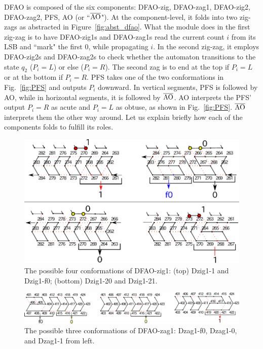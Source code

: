 

DFAO is composed of the six components: DFAO-zig, DFAO-zag1, DFAO-zig2, DFAO-zag2, PFS, AO (or  ``$\overline{\rm AO}$").
At the component-level, it folds into two zig-zags as abstracted in Figure~\ref{fig:abst_dfao}.
What the module does in the first zig-zag is to have DFAO-zig1s and DFAO-zag1s read the current count $i$ from its LSB and ``mark" the first 0, while propagating $i$.
In the second zig-zag, it employs DFAO-zig2s and DFAO-zag2s to check whether the automaton transitions to the state $q_2$ ($P_i = L$) or else ($P_i = R$).
The second zag is to end at the top if $P_i = L$ or at the bottom if $P_i = R$.
PFS takes one of the two conformations in Fig.~\ref{fig:PFS} and outputs $P_i$ downward.
In vertical segments, PFS is followed by AO, while in horizontal segments, it is followed by $\overline{\rm AO}$.
AO interprets the PFS' output $P_i = R$ as acute and $P_i = L$ as obtuse, as shown in Fig.~\ref{fig:PFS}.
$\overline{\rm AO}$ interprets them the other way around.
Let us explain briefly how each of the components folds to fulfill its roles.

\begin{figure}[h]
\centering
\includegraphics[width=0.7\linewidth]{pic/Dzig1.pdf}
  \caption{The possible four conformations of DFAO-zig1: (top) Dzig1-1 and Dzig1-f0; (bottom) Dzig1-20 and Dzig1-21.}
  \label{fig:DFAO-zig1}
\end{figure} 

\begin{figure}[h]
\centering
\includegraphics[width=\linewidth]{pic/Dzag1.pdf}
  \caption{The possible three conformations of DFAO-zag1: Dzag1-f0, Dzag1-0, and Dzag1-1 from left.}
  \label{fig:DFAO-zag1}
\end{figure} 


